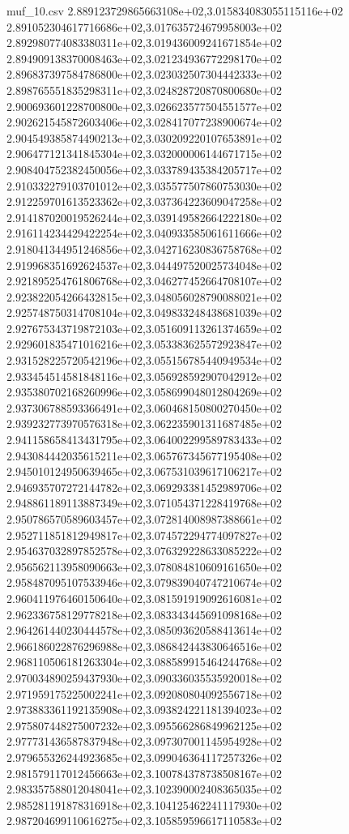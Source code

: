 \begin{filecontents*}{muf_10.csv}
2.889123729865663108e+02,3.015834083055115116e+02
2.891052304617716686e+02,3.017635724679958003e+02
2.892980774083380311e+02,3.019436009241671854e+02
2.894909138370008463e+02,3.021234936772298170e+02
2.896837397584786800e+02,3.023032507304442333e+02
2.898765551835298311e+02,3.024828720870800680e+02
2.900693601228700800e+02,3.026623577504551577e+02
2.902621545872603406e+02,3.028417077238900674e+02
2.904549385874490213e+02,3.030209220107653891e+02
2.906477121341845304e+02,3.032000006144671715e+02
2.908404752382450056e+02,3.033789435384205717e+02
2.910332279103701012e+02,3.035577507860753030e+02
2.912259701613523362e+02,3.037364223609047258e+02
2.914187020019526244e+02,3.039149582664222180e+02
2.916114234429422254e+02,3.040933585061611666e+02
2.918041344951246856e+02,3.042716230836758768e+02
2.919968351692624537e+02,3.044497520025734048e+02
2.921895254761806768e+02,3.046277452664708107e+02
2.923822054266432815e+02,3.048056028790088021e+02
2.925748750314708104e+02,3.049833248438681039e+02
2.927675343719872103e+02,3.051609113261374659e+02
2.929601835471016216e+02,3.053383625572923847e+02
2.931528225720542196e+02,3.055156785440949534e+02
2.933454514581848116e+02,3.056928592907042912e+02
2.935380702168260996e+02,3.058699048012804269e+02
2.937306788593366491e+02,3.060468150800270450e+02
2.939232773970576318e+02,3.062235901311687485e+02
2.941158658413431795e+02,3.064002299589783433e+02
2.943084442035615211e+02,3.065767345677195408e+02
2.945010124950639465e+02,3.067531039617106217e+02
2.946935707272144782e+02,3.069293381452989706e+02
2.948861189113887349e+02,3.071054371228419768e+02
2.950786570589603457e+02,3.072814008987388661e+02
2.952711851812949817e+02,3.074572294774097827e+02
2.954637032897852578e+02,3.076329228633085222e+02
2.956562113958090663e+02,3.078084810609161650e+02
2.958487095107533946e+02,3.079839040747210674e+02
2.960411976460150640e+02,3.081591919092616081e+02
2.962336758129778218e+02,3.083343445691098168e+02
2.964261440230444578e+02,3.085093620588413614e+02
2.966186022876296988e+02,3.086842443830646516e+02
2.968110506181263304e+02,3.088589915464244768e+02
2.970034890259437930e+02,3.090336035535920018e+02
2.971959175225002241e+02,3.092080804092556718e+02
2.973883361192135908e+02,3.093824221181394023e+02
2.975807448275007232e+02,3.095566286849962125e+02
2.977731436587837948e+02,3.097307001145954928e+02
2.979655326244923685e+02,3.099046364117257326e+02
2.981579117012456663e+02,3.100784378738508167e+02
2.983357588012048041e+02,3.102390002408365035e+02
2.985281191878316918e+02,3.104125462241117930e+02
2.987204699110616275e+02,3.105859596617110583e+02

\end{filecontents*}

